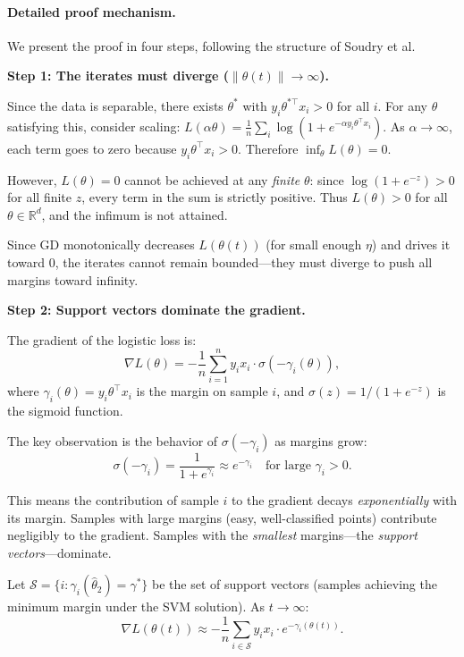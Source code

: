 \documentclass{article}
\begin{document}
\paragraph{Detailed proof mechanism.} We present the proof in four steps, following the structure of Soudry et al.

\textbf{Step 1: The iterates must diverge ($\|\theta(t)\| \to \infty$).}

Since the data is separable, there exists $\theta^*$ with $y_i \theta^{*\top} x_i > 0$ for all $i$. For any $\theta$ satisfying this, consider scaling: $L(\alpha \theta) = \frac{1}{n}\sum_i \log(1 + e^{-\alpha y_i \theta^\top x_i})$. As $\alpha \to \infty$, each term goes to zero because $y_i \theta^\top x_i > 0$. Therefore $\inf_\theta L(\theta) = 0$.

However, $L(\theta) = 0$ cannot be achieved at any \emph{finite} $\theta$: since $\log(1 + e^{-z}) > 0$ for all finite $z$, every term in the sum is strictly positive. Thus $L(\theta) > 0$ for all $\theta \in \mathbb{R}^d$, and the infimum is not attained.

Since GD monotonically decreases $L(\theta(t))$ (for small enough $\eta$) and drives it toward 0, the iterates cannot remain bounded---they must diverge to push all margins toward infinity.

\textbf{Step 2: Support vectors dominate the gradient.}

The gradient of the logistic loss is:
\begin{equation}
    \nabla L(\theta) = -\frac{1}{n} \sum_{i=1}^n y_i x_i \cdot \sigma(-\gamma_i(\theta)),
    \label{eq:gradient}
\end{equation}
where $\gamma_i(\theta) = y_i \theta^\top x_i$ is the margin on sample $i$, and $\sigma(z) = 1/(1+e^{-z})$ is the sigmoid function.

The key observation is the behavior of $\sigma(-\gamma_i)$ as margins grow:
\begin{equation}
    \sigma(-\gamma_i) = \frac{1}{1 + e^{\gamma_i}} \approx e^{-\gamma_i} \quad \text{for large } \gamma_i > 0.
\end{equation}

This means the contribution of sample $i$ to the gradient decays \emph{exponentially} with its margin. Samples with large margins (easy, well-classified points) contribute negligibly to the gradient. Samples with the \emph{smallest} margins---the \emph{support vectors}---dominate.

Let $\mathcal{S} = \{i : \gamma_i(\hat{\theta}_2) = \gamma^*\}$ be the set of support vectors (samples achieving the minimum margin under the SVM solution). As $t \to \infty$:
\begin{equation}
    \nabla L(\theta(t)) \approx -\frac{1}{n} \sum_{i \in \mathcal{S}} y_i x_i \cdot e^{-\gamma_i(\theta(t))}.
\end{equation}
\end{document}
